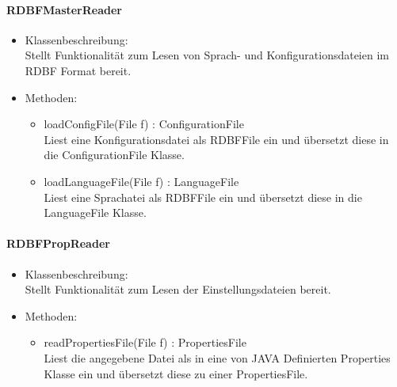 \documentclass[parskip=full]{scrartcl}
\begin{document}
\paragraph{RDBFMasterReader}
\begin{itemize}
\item Klassenbeschreibung: \\
Stellt Funktionalität zum Lesen von Sprach- und Konfigurationsdateien im RDBF Format bereit.
\item Methoden: \\
\begin{itemize}
\item loadConfigFile(File f) : ConfigurationFile \\
Liest eine Konfigurationsdatei als RDBFFile ein und übersetzt diese in die ConfigurationFile Klasse.
\item  loadLanguageFile(File f) : LanguageFile \\
Liest eine Sprachatei als RDBFFile ein und übersetzt diese in die LanguageFile Klasse.
\end{itemize}
\end{itemize}

\paragraph{RDBFPropReader}
\begin{itemize}
\item Klassenbeschreibung: \\
Stellt Funktionalität zum Lesen der Einstellungsdateien bereit.
\item Methoden: \\
\begin{itemize}
\item readPropertiesFile(File f) : PropertiesFile \\
Liest die angegebene Datei als in eine von JAVA Definierten Properties Klasse ein und übersetzt diese zu einer PropertiesFile.
\end{itemize}
\end{itemize}
\end{document}
